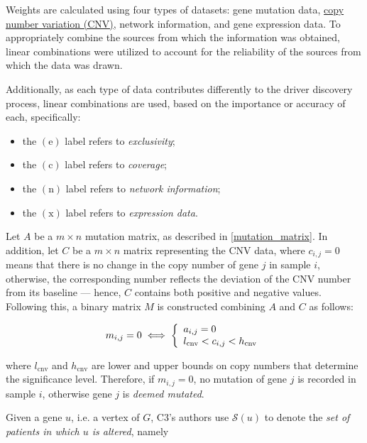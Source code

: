 Weights are calculated using four types of datasets: gene mutation data, \href{https://www.genome.gov/genetics-glossary/Copy-Number-Variation}{copy number variation (CNV)}, network information, and gene expression data. To appropriately combine the sources from which the information was obtained, linear combinations were utilized to account for the reliability of the sources from which the data was drawn.

Additionally, as each type of data contributes differently to the driver discovery process, linear combinations are used, based on the importance or accuracy of each, specifically:

\begin{itemize}
    \item the $(\mathrm e)$ label refers to \textit{exclusivity};
    \item the $(\mathrm c)$ label refers to \textit{coverage};
    \item the $(\mathrm n)$ label refers to \textit{network information};
    \item the $(\mathrm x)$ label refers to \textit{expression data}.
\end{itemize}

Let $A$ be a $m \times n$ mutation matrix, as described in \cref{mutation_matrix}. In addition, let $C$ be a $m \times n$ matrix representing the CNV data, where $c_{i, j} = 0$ means that there is no change in the copy number of gene $j$ in sample $i$, otherwise, the corresponding number reflects the deviation of the CNV number from its baseline --- hence, $C$ contains both positive and negative values. Following this, a binary matrix $M$ is constructed combining $A$ and $C$ as follows:

\begin{equation}
    m_{i, j} = 0 \iff \soe{l}{a_{i, j} = 0 \\ l_{\mathrm{cnv}} < c_{i, j} < h_{\mathrm{cnv}}}
\end{equation}

where $l_{\mathrm{cnv}}$ and $h_{\mathrm{cnv}}$ are lower and upper bounds on copy numbers that determine the significance level.  Therefore, if $m_{i, j} = 0$, no mutation of gene $j$ is recorded in sample $i$, otherwise gene $j$ is \textit{deemed mutated}.

Given a gene $u$, i.e. a vertex of $G$, C3's authors use $\mathscr{S}(u)$ to denote the \textit{set of patients in which $u$ is altered}, namely

